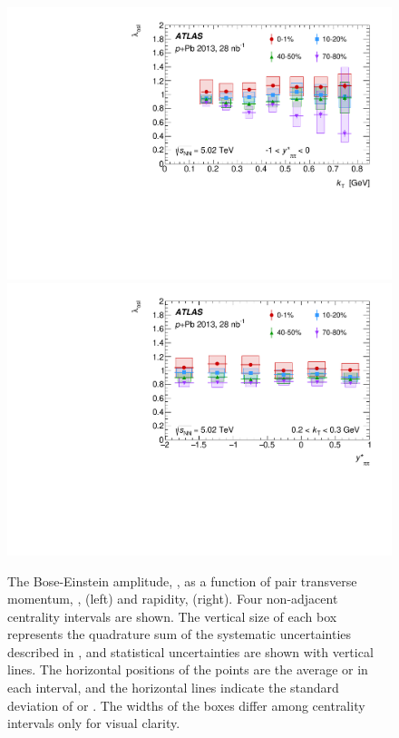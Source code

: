\begin{figure}[ht]
\centering
\includegraphics[width=0.49\linewidth]{canqosl_x_vs_kt.pdf}
\includegraphics[width=0.49\linewidth]{canqosl_x_vs_kys.pdf}
\caption{The Bose-Einstein amplitude, \losl, as a function of pair transverse momentum, \kt, (left) and rapidity, \kys (right). Four non-adjacent centrality intervals are shown. The vertical size of each box represents the quadrature sum of the systematic uncertainties described in , and statistical uncertainties are shown with vertical lines. The horizontal positions of the points are the average \kt or \kys in each interval, and the horizontal lines indicate the standard deviation of \kt or \kys. The widths of the boxes differ among centrality intervals only for visual clarity.}
\label{fig:results_qosl_x}
\end{figure}


